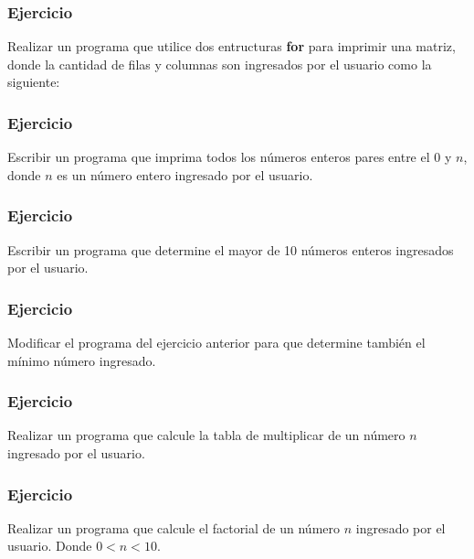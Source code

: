 \subsubsection{Ejercicio}
Realizar un programa que utilice dos entructuras \textbf{for} para imprimir una matriz, donde la cantidad de filas y columnas son ingresados por el usuario como la siguiente:
{\small
  \lstset{inputencoding=utf8/latin1}
  
}

\subsubsection{Ejercicio}
Escribir un programa que imprima todos los números enteros pares entre el 0 y $n$, donde $n$ es un número entero ingresado por el usuario.
{\small
  \lstset{inputencoding=utf8/latin1}
  
}

\subsubsection{Ejercicio}
Escribir un programa que determine el mayor de 10 números enteros ingresados por el usuario.
{\small
  \lstset{inputencoding=utf8/latin1}
  
}

\subsubsection{Ejercicio}
Modificar el programa del ejercicio anterior para que determine también el mínimo número ingresado.
{\small
  \lstset{inputencoding=utf8/latin1}
  
}

\subsubsection{Ejercicio}
Realizar un programa que calcule la tabla de multiplicar de un número $n$ ingresado por el usuario.
{\small
  \lstset{inputencoding=utf8/latin1}
  
}

\subsubsection{Ejercicio}
Realizar un programa que calcule el factorial de un número $n$ ingresado por el usuario. Donde $0<n<10$.
{\small
  \lstset{inputencoding=utf8/latin1}
  
}

